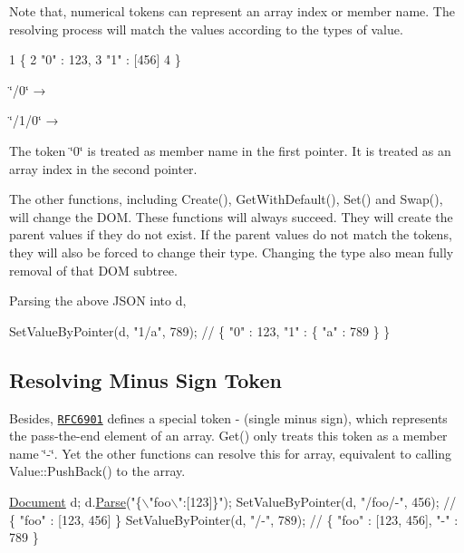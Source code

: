 Note that, numerical tokens can represent an array index or member name. The resolving process will match the values according to the types of value.


\begin{DoxyCode}
1 \{
2     "0" : 123,
3     "1" : [456]
4 \}
\end{DoxyCode}



\begin{DoxyEnumerate}
\item {\ttfamily \char`\"{}/0\char`\"{}} → {}
\item {\ttfamily \char`\"{}/1/0\char`\"{}} → {}
\end{DoxyEnumerate}

The token {\ttfamily \char`\"{}0\char`\"{}} is treated as member name in the first pointer. It is treated as an array index in the second pointer.

The other functions, including {\ttfamily Create()}, {\ttfamily Get\+With\+Default()}, {\ttfamily Set()} and {\ttfamily Swap()}, will change the D\+OM. These functions will always succeed. They will create the parent values if they do not exist. If the parent values do not match the tokens, they will also be forced to change their type. Changing the type also mean fully removal of that D\+OM subtree.

Parsing the above J\+S\+ON into {\ttfamily d},


\begin{DoxyCode}
SetValueByPointer(d, \textcolor{stringliteral}{"1/a"}, 789); \textcolor{comment}{// \{ "0" : 123, "1" : \{ "a" : 789 \} \}}
\end{DoxyCode}


\subsection*{Resolving Minus Sign Token}

Besides, \href{https://tools.ietf.org/html/rfc6901}{\tt R\+F\+C6901} defines a special token {\ttfamily -\/} (single minus sign), which represents the pass-\/the-\/end element of an array. {\ttfamily Get()} only treats this token as a member name \textquotesingle{}\char`\"{}-\/\char`\"{}\textquotesingle{}. Yet the other functions can resolve this for array, equivalent to calling {\ttfamily Value\+::\+Push\+Back()} to the array.


\begin{DoxyCode}
\hyperlink{class_generic_document}{Document} d;
d.\hyperlink{class_generic_document_aebd4e7fddd80c1e1174837aee6d2159b}{Parse}(\textcolor{stringliteral}{"\{\(\backslash\)"foo\(\backslash\)":[123]\}"});
SetValueByPointer(d, \textcolor{stringliteral}{"/foo/-"}, 456); \textcolor{comment}{// \{ "foo" : [123, 456] \}}
SetValueByPointer(d, \textcolor{stringliteral}{"/-"}, 789);    \textcolor{comment}{// \{ "foo" : [123, 456], "-" : 789 \}}
\end{DoxyCode}


